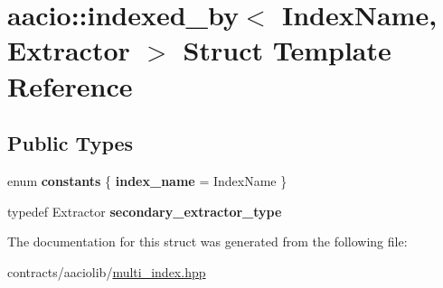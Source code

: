 \hypertarget{structaacio_1_1indexed__by}{}\section{aacio\+:\+:indexed\+\_\+by$<$ Index\+Name, Extractor $>$ Struct Template Reference}
\label{structaacio_1_1indexed__by}
\subsection*{Public Types}
\begin{DoxyCompactItemize}
\item 
\mbox{\label{structaacio_1_1indexed__by_a8090a87f2ea6b6127e32dfecbdb2efcb}} 
enum {\bfseries constants} \{ {\bfseries index\+\_\+name} = Index\+Name
 \}
\item 
\mbox{\label{structaacio_1_1indexed__by_ae61ce186a64f137c7bbd750ceaf44a6c}} 
typedef Extractor {\bfseries secondary\+\_\+extractor\+\_\+type}
\end{DoxyCompactItemize}


The documentation for this struct was generated from the following file\+:\begin{DoxyCompactItemize}
\item 
contracts/aaciolib/\mbox{\hyperlink{multi__index_8hpp}{multi\+\_\+index.\+hpp}}\end{DoxyCompactItemize}
